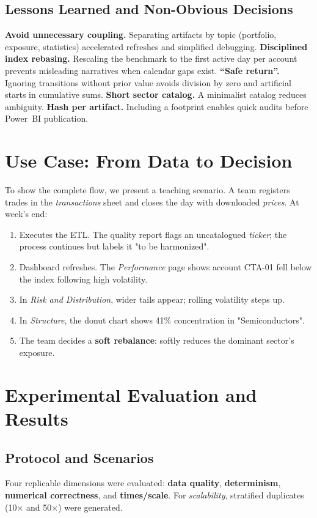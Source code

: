 \documentclass[conference]{IEEEtran}
\begin{document}
\subsection{Lessons Learned and Non-Obvious Decisions}
\textbf{Avoid unnecessary coupling.} Separating artifacts by topic (portfolio, exposure, statistics) accelerated refreshes and simplified debugging.
\textbf{Disciplined index rebasing.} Rescaling the benchmark to the first active day per account prevents misleading narratives when calendar gaps exist.
\textbf{“Safe return”.} Ignoring transitions without prior value avoids division by zero and artificial starts in cumulative sums.
\textbf{Short sector catalog.} A minimalist catalog reduces ambiguity.
\textbf{Hash per artifact.} Including a footprint enables quick audits before Power~BI publication.

\section{Use Case: From Data to Decision}
To show the complete flow, we present a teaching scenario. A team registers trades in the \emph{transactions} sheet and closes the day with downloaded \emph{prices}. At week's end:
\begin{enumerate}
  \item Executes the ETL. The quality report flags an uncatalogued \emph{ticker}; the process continues but labels it "to be harmonized".
  \item Dashboard refreshes. The \emph{Performance} page shows account CTA-01 fell below the index following high volatility.
  \item In \emph{Risk and Distribution}, wider tails appear; rolling volatility steps up.
  \item In \emph{Structure}, the donut chart shows 41\% concentration in "Semiconductors".
  \item The team decides a \textbf{soft rebalance}: softly reduces the dominant sector's exposure.
\end{enumerate}

\section{Experimental Evaluation and Results}
\subsection{Protocol and Scenarios}
Four replicable dimensions were evaluated: \textbf{data quality}, \textbf{determinism}, \textbf{numerical correctness}, and \textbf{times/scale}. For \emph{scalability}, stratified duplicates (10$\times$ and 50$\times$) were generated.
\end{document}
